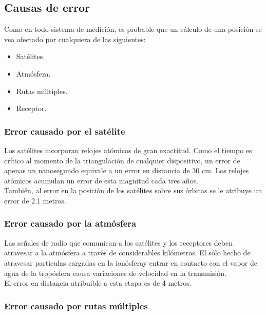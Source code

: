 \subsection{Causas de error}

Como en todo sistema de medición, es probable que un cálculo de una posición se vea afectado por cualquiera de las siguientes:

\begin{itemize}
	\item Satélites.
	\item Atmósfera.
	\item Rutas múltiples.
	\item Receptor.
\end{itemize} 

\subsubsection{Error causado por el satélite}

Los satélites incorporan relojes atómicos de gran exactitud. Como el tiempo es crítico al momento de la triangulación de cualquier dispositivo, un error de apenas un nanosegundo equivale a un error en distancia de 30 cm. Los relojes atómicos acumulan un error de esta magnitud cada tres años. \\

También, al error en la posición de los satélites sobre sus órbitas se le atribuye un error de 2.1 metros.

\subsubsection{Error causado por la atmósfera}

Las señales de radio que comunican a los satélites y los receptores deben atravesar a la atmósfera a través de considerables kilómetros. El sólo hecho de atravesar partículas cargadas en la ionósfera\footnotemark y entrar en contacto con el vapor de agua de la tropósfera causa variaciones de velocidad en la transmisión. \\

El error en distancia atribuible a esta etapa es de 4 metros.


\subsubsection{Error causado por rutas múltiples}

